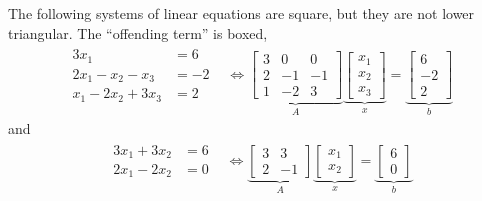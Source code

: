 The following systems of linear equations are square, but they are not lower triangular. The ``offending term'' is boxed,
\begin{equation}
\label{eq:notLT01}
\begin{array}{cc}
    \begin{aligned}
     3 x_1 &=6 \\
     2 x_1 - x_2 -\boxed{x_3} &= -2\\
    x_1 - 2 x_2 + 3 x_3  &= 2
    \end{aligned} &  \iff \underbrace{\left[\begin{array}{rrc} 3 & 0 & 0\\
2 & -1 & \boxed{-1} \\ 1 & -2 & 3  \end{array}\right]}_{A}  \underbrace{\left[\begin{array}{c} x_1 \\x_2 \\x_3\end{array} \right]}_{x}
= \underbrace{\left[\begin{array}{r} 6 \\-2 \\2\end{array} \right]}_{b}
    \end{array}
\end{equation}
and
\begin{equation}
\label{eq:notLT02}
\begin{array}{cc}
  \begin{aligned}
     3 x_1 + \boxed{3 x_2} &=6 \\
     2 x_1 - 2 x_2&= 0
    \end{aligned} &  \iff \underbrace{\left[\begin{array}{rc} 3 & \boxed{3}\\
2 & -1  \end{array}\right]}_{A}  \underbrace{\left[\begin{array}{c} x_1 \\x_2 \end{array} \right]}_{x}
= \underbrace{\left[\begin{array}{r} 6 \\0 \end{array} \right]}_{b}
    \end{array}
\end{equation}

